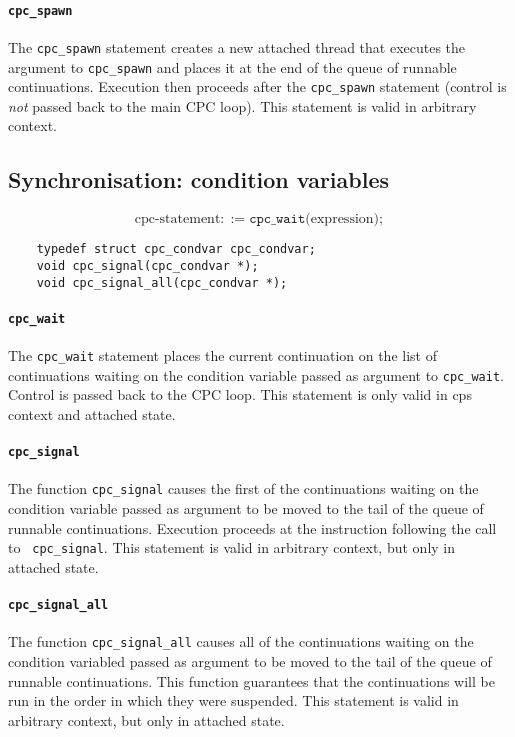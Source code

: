 \documentclass[a4paper]{report}
\begin{document}
\paragraph{\tt cpc\_spawn} The {\tt cpc\_spawn} statement creates a new
attached thread that executes the argument to {\tt cpc\_spawn} and places
it at the end of the queue of runnable continuations.  Execution then
proceeds after the {\tt cpc\_spawn} statement (control is {\em not\/}
passed back to the main CPC loop).  This statement is valid in arbitrary
context.

\subsection{Synchronisation: condition variables}

\[ \mbox{cpc-statement} ::=
   \mathtt{cpc\_wait} \mathtt{(} \mbox{expression} \mathtt{)} \mathtt{;} \]

\begin{verbatim}
    typedef struct cpc_condvar cpc_condvar;
    void cpc_signal(cpc_condvar *);
    void cpc_signal_all(cpc_condvar *);
\end{verbatim}

\paragraph{\tt cpc\_wait} The {\tt cpc\_wait} statement places the
current continuation on the list of continuations waiting on the
condition variable passed as argument to {\tt cpc\_wait}.  Control is
passed back to the CPC loop.  This statement is only valid in cps
context and attached state.

\paragraph{\tt cpc\_signal} The function {\tt cpc\_signal} causes the
first of the continuations waiting on the condition variable passed as
argument to be moved to the tail of the queue of runnable continuations.
Execution proceeds at the instruction following the call to {\tt
  cpc\_signal}.  This statement is valid in arbitrary context, but only in
attached state.

\paragraph{\tt cpc\_signal\_all} The function {\tt cpc\_signal\_all}
causes all of the continuations waiting on the condition variabled passed
as argument to be moved to the tail of the queue of runnable continuations.
This function guarantees that the continuations will be run in the order in
which they were suspended.  This statement is valid in arbitrary context,
but only in attached state.
\end{document}
